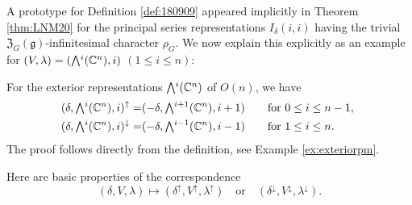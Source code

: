 A prototype for Definition \ref{def:180909}
 appeared implicitly
 in Theorem \ref{thm:LNM20}
 for the principal series representations $I_{\delta}(i,i)$
 having the trivial ${\mathfrak{Z}}_G({\mathfrak{g}})$-infinitesimal character $\rho_G$.  
We now explain this explicitly
 as an example for $(V,\lambda)=(\Exterior^i({\mathbb{C}}^n), i)$
 $(1 \le i \le n)$:  
\begin{example}
\label{ex:up}
For the exterior representations 
 $\Exterior^i({\mathbb{C}}^n)$
 of $O(n)$, 
 we have
\begin{alignat*}{2}
 (\delta,\Exterior^i({\mathbb{C}}^n), i)^{\uparrow}
 =&
 (-\delta,\Exterior^{i+1}({\mathbb{C}}^n), i+1)
 \quad
&&\text{for $0 \le i \le n-1$, }
\\
(\delta,\Exterior^i({\mathbb{C}}^n), i)^{\downarrow}
 =&
 (-\delta,\Exterior^{i-1}({\mathbb{C}}^n), i-1)
 \quad
&&\text{for $1 \le i \le n$.  }
\end{alignat*}
The proof follows directly from 
 the definition, 
 see Example \ref{ex:exteriorpm}.  
\end{example}

Here are basic properties of the correspondence
\[
  (\delta,V,\lambda) \mapsto
(\delta^{\uparrow},V^{\uparrow},\lambda^{\uparrow})
\quad
\text{or}
\quad
(\delta^{\downarrow}, V^{\downarrow}, \lambda^{\downarrow}).  
\]

